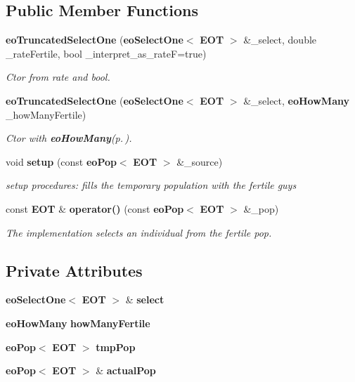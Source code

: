 \subsection*{Public Member Functions}
\begin{CompactItemize}
\item 
{\bf eo\-Truncated\-Select\-One} ({\bf eo\-Select\-One}$<$ {\bf EOT} $>$ \&\_\-select, double \_\-rate\-Fertile, bool \_\-interpret\_\-as\_\-rate\-F=true)\label{classeo_truncated_select_one_a0}

\begin{CompactList}\small\item\em Ctor from rate and bool. \item\end{CompactList}\item 
{\bf eo\-Truncated\-Select\-One} ({\bf eo\-Select\-One}$<$ {\bf EOT} $>$ \&\_\-select, {\bf eo\-How\-Many} \_\-how\-Many\-Fertile)\label{classeo_truncated_select_one_a1}

\begin{CompactList}\small\item\em Ctor with {\bf eo\-How\-Many}{\rm (p.\,\pageref{classeo_how_many})}. \item\end{CompactList}\item 
void {\bf setup} (const {\bf eo\-Pop}$<$ {\bf EOT} $>$ \&\_\-source)\label{classeo_truncated_select_one_a2}

\begin{CompactList}\small\item\em setup procedures: fills the temporary population with the fertile guys \item\end{CompactList}\item 
const {\bf EOT} \& {\bf operator()} (const {\bf eo\-Pop}$<$ {\bf EOT} $>$ \&\_\-pop)
\begin{CompactList}\small\item\em The implementation selects an individual from the fertile pop. \item\end{CompactList}\end{CompactItemize}
\subsection*{Private Attributes}
\begin{CompactItemize}
\item 
{\bf eo\-Select\-One}$<$ {\bf EOT} $>$ \& {\bf select}\label{classeo_truncated_select_one_r0}

\item 
{\bf eo\-How\-Many} {\bf how\-Many\-Fertile}\label{classeo_truncated_select_one_r1}

\item 
{\bf eo\-Pop}$<$ {\bf EOT} $>$ {\bf tmp\-Pop}\label{classeo_truncated_select_one_r2}

\item 
{\bf eo\-Pop}$<$ {\bf EOT} $>$ \& {\bf actual\-Pop}\label{classeo_truncated_select_one_r3}

\end{CompactItemize}


